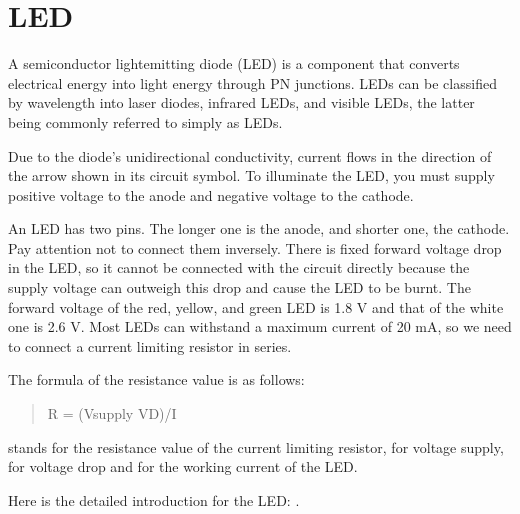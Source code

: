 \documentclass[a4paper,11pt,english]{sphinxmanual}
\let\sphinxpxdimen\pdfpxdimen\else\newdimen\sphinxpxdimen
\begin{document}
\sphinxstepscope


\section{LED}
\label{\detokenize{Components_Kit/component_led:led}}\label{\detokenize{Components_Kit/component_led:cpn-led}}\label{\detokenize{Components_Kit/component_led::doc}}
\noindent\sphinxincludegraphics[width=400\sphinxpxdimen]{{LED}.png}

\sphinxAtStartPar
A semiconductor light\sphinxhyphen{}emitting diode (LED) is a component that converts electrical energy into light energy through PN junctions. LEDs can be classified by wavelength into laser diodes, infrared LEDs, and visible LEDs, the latter being commonly referred to simply as LEDs.

\sphinxAtStartPar
Due to the diode’s unidirectional conductivity, current flows in the direction of the arrow shown in its circuit symbol. To illuminate the LED, you must supply positive voltage to the anode and negative voltage to the cathode.

\noindent{}

\sphinxAtStartPar
An LED has two pins. The longer one is the anode, and shorter one, the cathode. Pay attention not to connect them inversely. There is fixed forward voltage drop in the LED, so it cannot be connected with the circuit directly because the supply voltage can outweigh this drop and cause the LED to be burnt. The forward voltage of the red, yellow, and green LED is 1.8 V and that of the white one is 2.6 V. Most LEDs can withstand a maximum current of 20 mA, so we need to connect a current limiting resistor in series.

\sphinxAtStartPar
The formula of the resistance value is as follows:
\begin{quote}

\sphinxAtStartPar
R = (Vsupply \textendash{} VD)/I
\end{quote}

\sphinxAtStartPar
{} stands for the resistance value of the current limiting resistor,  for voltage supply,  for voltage drop and  for the working current of the LED.

\sphinxAtStartPar
Here is the detailed introduction for the LED: .
\end{document}
